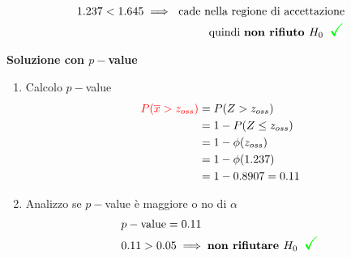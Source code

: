 \documentclass{article}  %
\theoremstyle{definition}
\begin{document}
\begin{esercizio}
\begin{enumerate}
\begin{align*}
			1.237 < 1.645 \implies \text{ cade nella regione di accettazione} \\ \text{quindi \textbf{non rifiuto $H_0$}} \textcolor{green}{\scalebox{1.6}{ \checkmark}}
		\end{align*}
	\end{enumerate}
	\begin{center}
		\textbf{Soluzione con $p-$value}
	\end{center}
	\begin{enumerate}
		\item Calcolo $p-$value
		\begin{align*}
			\textcolor{red}{P(\overline{x} > z_{oss})} &= P(Z > z_{oss}) \\
			&= 1 - P(Z \leq z_{oss}) \\
			&= 1 - \phi(z_{oss}) \\
			&= 1- \phi(1.237) \\
			&= 1 - 0.8907 = 0.11
		\end{align*}
		\item Analizzo se $p-$value è maggiore o no di $\alpha$
		\begin{align*}
			&p-\text{value}=0.11 \\
			&0.11 > 0.05 \implies \text{\textbf{non rifiutare $H_0$}} \textcolor{green}{\scalebox{1.6}{ \checkmark}}
		\end{align*}
	\end{enumerate}
\end{esercizio}
\newpage
\end{document}
